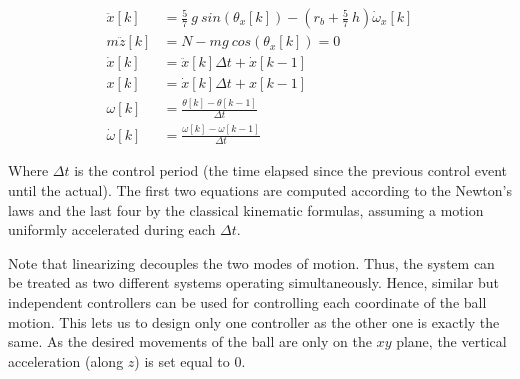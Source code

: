 \begin{align*}
\ddot{x}[k] &= \frac{5}{7}\ g\ sin (\theta_x[k]) - \left ( r_b + \frac{5}{7}\ h \right ) \dot{\omega}_x[k]\\
m\ddot{z}[k] &= N - mg\ cos(\theta_x[k]) = 0\\
\dot{x}[k] &= \ddot{x}[k] \Delta t + \dot{x}[k-1]\\
x[k] &= \dot{x}[k] \Delta t + x[k-1]\\
\omega[k] &= \frac{ \theta[k] - \theta[k-1] } {\Delta t}\\
\dot{\omega}[k] &= \frac{ \omega[k] - \omega[k-1] } {\Delta t}
\end{align*}

Where $\Delta t$ is the control period (the time elapsed since the previous
control event until the actual). The first two equations are computed
according to the Newton's laws and the last four by the classical kinematic
formulas, assuming a motion uniformly accelerated during each $\Delta t$.

Note that linearizing decouples the two modes of motion.
Thus, the system can be treated as two different systems operating
simultaneously. Hence, similar but independent controllers can be used for
controlling each coordinate of the ball motion.
This lets us to design only one controller as the other one is exactly the same.
As the desired movements of the ball are only on the $xy$ plane,
the vertical acceleration (along $z$) is set equal to $0$.


